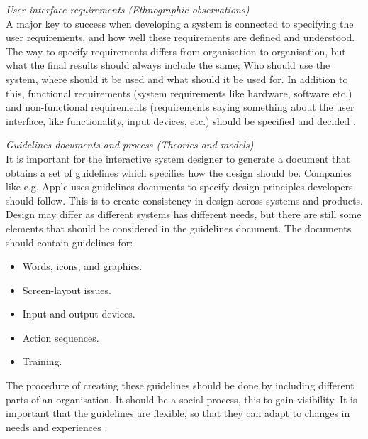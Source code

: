 \emph{User-interface requirements (Ethnographic observations)}\\
A major key to success when developing a system is connected to specifying the user requirements, and how well these requirements are defined and understood.  The way to specify requirements differs from organisation to organisation, but what the final results should always include the same; Who should use the system, where should it be used and what should it be used for. In addition to this, functional requirements (system requirements like hardware,  software etc.) and non-functional requirements (requirements saying something about the user interface, like functionality, input devices, etc.) should be specified and decided \cite{mmi}.

\emph{Guidelines documents and process (Theories and models)}\\
It is important for the interactive system designer to generate a document that obtains a set of guidelines which specifies how the design should be. Companies like e.g. Apple uses guidelines documents to specify design principles developers should follow. This is to create consistency in design across systems and products. Design may differ as different systems has different needs, but there are still some elements that should be considered in the guidelines document. The documents should contain guidelines for:

\begin{itemize}
\renewcommand{\labelitemi}{$\bullet$}
\item Words, icons, and graphics.
\item Screen-layout issues.
\item Input and output devices.
\item Action sequences.
\item Training.
\end{itemize}

The procedure of creating these guidelines should be done by including different parts of an organisation. It should be a social process, this to gain visibility. It is important that the guidelines are flexible, so that they can adapt to changes in needs and experiences \cite{mmi}. 

